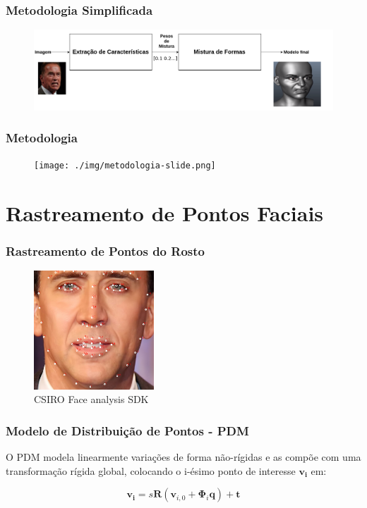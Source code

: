 \documentclass[brazil]{beamer}
\begin{document}
\begin{frame}
 	\frametitle{Metodologia Simplificada}
       \begin{figure}
         \centering
         \includegraphics[width = 1.1\textwidth]{./img/EZ3d-simplified.png}
       \end{figure}   
\end{frame}


\begin{frame}
	\frametitle{Metodologia}
      \begin{figure}
        \centering
        \texttt{[image: ./img/metodologia-slide.png]}
      \end{figure}   
\end{frame}

\section{Rastreamento de Pontos Faciais}

\begin{frame}
\frametitle{Rastreamento de Pontos do Rosto}
        \begin{figure}
            \centering
            \includegraphics[width = 0.4\textwidth, keepaspectratio]{./img/nick-marked.png}
           \caption{CSIRO Face analysis SDK}
      \end{figure}
\end{frame}


\begin{frame}
\frametitle{Modelo de Distribuição de Pontos - PDM}

\begin{definition}
  O PDM modela linearmente variações de forma não-rígidas e as compõe com uma transformação rígida global, colocando o i-ésimo ponto de interesse
$\bm{v_i}$ em:

\begin{equation}
 \bm{v_i} = s \bm{R} ( \bm{v}_{i,0} + \bm{\Phi}_i \bm{q}) + \bm{t}
\label{eq:PDM-equation}
\end{equation}
\end{definition}
\end{frame}
\end{document}
